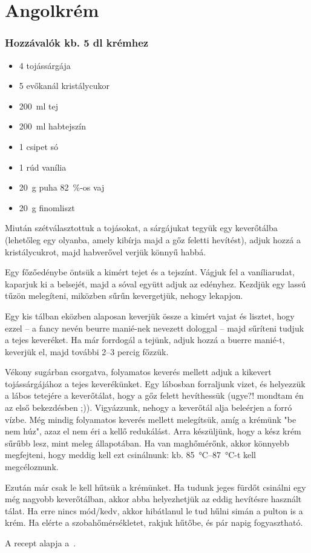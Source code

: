 \newpage
\section*{Angolkrém} \label{sec:angolkem}

\subsubsection*{Hozzávalók kb. 5 dl krémhez}
\begin{itemize}
    \item \num{4} tojássárgája
    \item \num{5} evőkanál kristálycukor
    \item \qty{200}{\ml} tej
    \item \qty{200}{\ml} habtejszín
    \item \num{1} csipet só
    \item \num{1} rúd vanília
    \item \qty{20}{\g} puha \qty{82}{\percent}-os vaj
    \item \qty{20}{\g} finomliszt
\end{itemize}

Miután szétválasztottuk a tojásokat, a sárgájukat tegyük egy keverőtálba (lehetőleg egy olyanba, amely kibírja majd a gőz feletti hevítést), adjuk hozzá a kristálycukrot, majd habverővel verjük könnyű habbá.

Egy főzőedénybe öntsük a kimért tejet és a tejszínt. Vágjuk fel a vaníliarudat, kaparjuk ki a belsejét, majd a sóval együtt adjuk az edényhez. Kezdjük egy lassú tűzön melegíteni, miközben sűrűn kevergetjük, nehogy lekapjon.

Egy kis tálban eközben alaposan keverjük össze a kimért vajat és lisztet, hogy ezzel -- a fancy nevén beurre manié-nek nevezett dologgal -- majd sűríteni tudjuk a tejes keveréket. Ha már forrdogál a tejünk, adjuk hozzá a buerre manié-t, keverjük el, majd további \numrange{2}{3} percig főzzük.

Vékony sugárban csorgatva, folyamatos keverés mellett adjuk a kikevert tojássárgájához a tejes keverékünket. Egy lábosban forraljunk vizet, és helyezzük a lábos tetejére a keverőtálat, hogy a gőz felett hevíthessük (ugye?! mondtam én az első bekezdésben ;)). Vigyázzunk, nehogy a keverőtál alja beleérjen a forró vízbe. Még mindig folyamatos keverés mellett melegítsük, amíg a krémünk "be nem húz", azaz el nem éri a kellő redukálást. Arra készüljünk, hogy a kész krém sűrűbb lesz, mint meleg állapotában. Ha van maghőmérőnk, akkor könnyebb megfejteni, hogy meddig kell ezt csinálnunk: kb. \qtyrange{85}{87}{\celsius}-t kell megcéloznunk.

Ezután már csak le kell hűtsük a krémünket. Ha tudunk jeges fürdőt csinálni egy még nagyobb keverőtálban, akkor abba helyezhetjük az eddig hevítésre használt tálat. Ha erre nincs mód/kedv, akkor hibátlanul le tud hűlni simán a pulton is a krém. Ha elérte a szobahőmérsékletet, rakjuk hűtőbe, és pár napig fogyasztható.


A recept alapja a~\cite{szell_angolkrem}.
